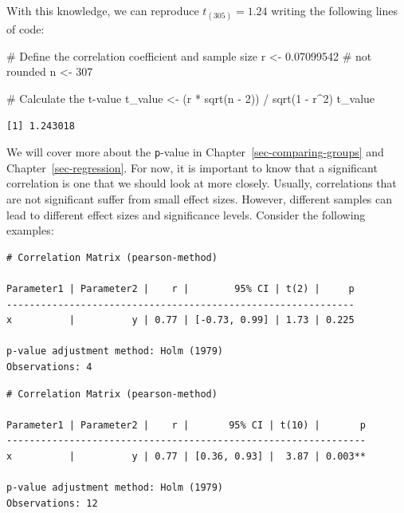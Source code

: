 \documentclass[
  letterpaper,
]{krantz}
\makeatletter
\newenvironment{Shaded}{\begin{snugshade}}{\end{snugshade}}
\newcommand{\CommentTok}[1]{\textcolor[rgb]{0.37,0.37,0.37}{#1}}
\newcommand{\DecValTok}[1]{\textcolor[rgb]{0.68,0.00,0.00}{#1}}
\newcommand{\FloatTok}[1]{\textcolor[rgb]{0.68,0.00,0.00}{#1}}
\newcommand{\FunctionTok}[1]{\textcolor[rgb]{0.28,0.35,0.67}{#1}}
\newcommand{\NormalTok}[1]{\textcolor[rgb]{0.00,0.23,0.31}{#1}}
\newcommand{\OtherTok}[1]{\textcolor[rgb]{0.00,0.23,0.31}{#1}}
\newcommand{\SpecialCharTok}[1]{\textcolor[rgb]{0.37,0.37,0.37}{#1}}
\newenvironment{kframe}{%
\medskip{}
\setlength{\fboxsep}{.8em}
 \def\at@end@of@kframe{}%
 \ifinner\ifhmode%
  \def\at@end@of@kframe{\end{minipage}}%
  \begin{minipage}{\columnwidth}%
 \fi\fi%
 \def\FrameCommand##1{\hskip\@totalleftmargin \hskip-\fboxsep
 \colorbox{shadecolor}{##1}\hskip-\fboxsep
     \hskip-\linewidth \hskip-\@totalleftmargin \hskip\columnwidth}%
 \MakeFramed {\advance\hsize-\width
   \@totalleftmargin\z@ \linewidth\hsize
   \@setminipage}}%
 {\par\unskip\endMakeFramed%
 \at@end@of@kframe}
\renewenvironment{Shaded}{\begin{kframe}}{\end{kframe}}
\makeatother
\begin{document}
With this knowledge, we can reproduce \(t_{(305)} = 1.24\) writing the
following lines of code:

\begin{Shaded}
\begin{Highlighting}[]
\CommentTok{\# Define the correlation coefficient and sample size}
\NormalTok{r }\OtherTok{\textless{}{-}} \FloatTok{0.07099542} \CommentTok{\# not rounded}
\NormalTok{n }\OtherTok{\textless{}{-}} \DecValTok{307}

\CommentTok{\# Calculate the t{-}value}
\NormalTok{t\_value }\OtherTok{\textless{}{-}}\NormalTok{ (r }\SpecialCharTok{*} \FunctionTok{sqrt}\NormalTok{(n }\SpecialCharTok{{-}} \DecValTok{2}\NormalTok{)) }\SpecialCharTok{/} \FunctionTok{sqrt}\NormalTok{(}\DecValTok{1} \SpecialCharTok{{-}}\NormalTok{ r}\SpecialCharTok{\^{}}\DecValTok{2}\NormalTok{)}
\NormalTok{t\_value}
\end{Highlighting}
\end{Shaded}

\begin{verbatim}
[1] 1.243018
\end{verbatim}

We will cover more about the \texttt{p}-value in
Chapter~\ref{sec-comparing-groups} and Chapter~\ref{sec-regression}. For
now, it is important to know that a significant correlation is one that
we should look at more closely. Usually, correlations that are not
significant suffer from small effect sizes. However, different samples
can lead to different effect sizes and significance levels. Consider the
following examples:

\begin{verbatim}
# Correlation Matrix (pearson-method)

Parameter1 | Parameter2 |    r |        95% CI | t(2) |     p
-------------------------------------------------------------
x          |          y | 0.77 | [-0.73, 0.99] | 1.73 | 0.225

p-value adjustment method: Holm (1979)
Observations: 4
\end{verbatim}

\begin{verbatim}
# Correlation Matrix (pearson-method)

Parameter1 | Parameter2 |    r |       95% CI | t(10) |       p
---------------------------------------------------------------
x          |          y | 0.77 | [0.36, 0.93] |  3.87 | 0.003**

p-value adjustment method: Holm (1979)
Observations: 12
\end{verbatim}
\end{document}
